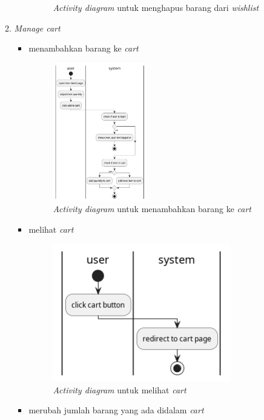 \documentclass[a4paper]{article}
\begin{document}
\begin{enumerate}
\begin{enumerate}
\begin{itemize}
\begin{figure}[h]
                \caption{\textit{Activity diagram} untuk menghapus barang dari \textit{wishlist}}
            \end{figure}
        \end{itemize}

        \newpage
        \item \textit{Manage cart}
        \begin{itemize}
            \item menambahkan barang ke \textit{cart}
            \begin{figure}[h]
                \centering
                \includegraphics*[height=6cm]{./diagram/activity diagram/13. cart/add to cart/add to cart.png}
                \caption{\textit{Activity diagram} untuk menambahkan barang ke \textit{cart}}
            \end{figure}
            \item melihat \textit{cart}
            \begin{figure}[h]
                \centering
                \includegraphics*[height=6cm]{./diagram/activity diagram/13. cart/query cart list/query cart list.png}
                \caption{\textit{Activity diagram} untuk melihat \textit{cart}}
            \end{figure}
            \newpage
            \item merubah jumlah barang yang ada didalam \textit{cart}

\end{itemize}
\end{enumerate}
\end{enumerate}
\end{document}
